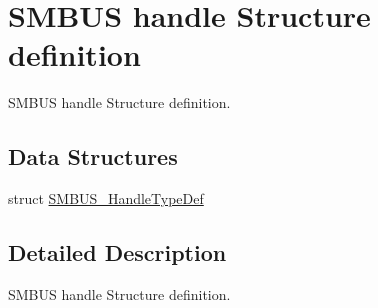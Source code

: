 \hypertarget{group___s_m_b_u_s__handle___structure__definition}{}\section{S\+M\+B\+US handle Structure definition}
\label{group___s_m_b_u_s__handle___structure__definition}


S\+M\+B\+US handle Structure definition.  


\subsection*{Data Structures}
\begin{DoxyCompactItemize}
\item 
struct \hyperlink{struct_s_m_b_u_s___handle_type_def}{S\+M\+B\+U\+S\+\_\+\+Handle\+Type\+Def}
\end{DoxyCompactItemize}


\subsection{Detailed Description}
S\+M\+B\+US handle Structure definition. 

